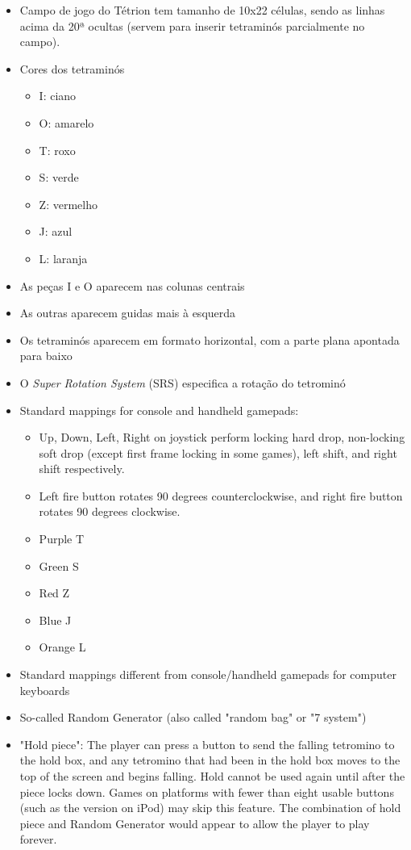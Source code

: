 \documentclass[
	12pt,				%
	openright,			%
	oneside,			%
	a4paper,			%
	brazil,				%
	]{abntex2}
\begin{document}
\begin{itemize}
  \item Campo de jogo do Tétrion tem tamanho de 10x22 células, sendo as linhas acima da 20ª ocultas (servem para inserir tetraminós parcialmente no campo).
  \item Cores dos tetraminós
  \begin{itemize}
  	\item I: ciano
  	\item O: amarelo
  	\item T: roxo
  	\item S: verde
  	\item Z: vermelho
  	\item J: azul
  	\item L: laranja
  \end{itemize}
  \item As peças I e O aparecem nas colunas centrais
  \item As outras aparecem guidas mais à esquerda
  \item Os tetraminós aparecem em formato horizontal, com a parte plana apontada para baixo
  \item O \textit{Super Rotation System} (SRS) especifica a rotação do tetrominó
  \item Standard mappings for console and handheld gamepads:
  \begin{itemize}
   	\item Up, Down, Left, Right on joystick perform locking hard drop, non-locking soft drop (except first frame locking in some games), left shift, and right shift respectively.
   	\item Left fire button rotates 90 degrees counterclockwise, and right fire button rotates 90 degrees clockwise.
   	\item Purple T
   	\item Green S
   	\item Red Z
   	\item Blue J
   	\item Orange L
  \end{itemize}
  \item Standard mappings different from console/handheld gamepads for computer keyboards
  \item So-called Random Generator (also called "random bag" or "7 system")
  \item "Hold piece": The player can press a button to send the falling tetromino to the hold box, and any tetromino that had been in the hold box moves to the top of the screen and begins falling. Hold cannot be used again until after the piece locks down. Games on platforms with fewer than eight usable buttons (such as the version on iPod) may skip this feature. The combination of hold piece and Random Generator would appear to allow the player to play forever.

\end{itemize}
\end{document}
